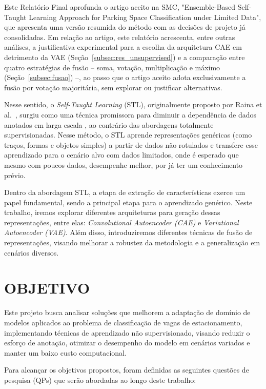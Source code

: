 \documentclass{article}
\begin{document}
Este Relatório Final aprofunda o artigo aceito na SMC, "Ensemble-Based Self-Taught Learning Approach for Parking Space Classification under Limited Data", que apresenta uma versão resumida do método com as decisões de projeto já consolidadas. Em relação ao artigo, este relatório acrescenta, entre outras análises, a justificativa experimental para a escolha da arquitetura CAE em detrimento da VAE (Seção~\ref{subsec:res_unsupervised}) e a comparação entre quatro estratégias de fusão -- soma, votação, multiplicação e máximo (Seção~\ref{subsec:fusao}) --, ao passo que o artigo aceito adota exclusivamente a fusão por votação majoritária, sem explorar ou justificar alternativas.

Nesse sentido, o \textit{Self-Taught Learning} (STL), originalmente proposto por Raina et al.~\cite{Raina2007SelfTaught}, surgiu como uma técnica promissora para diminuir a dependência de dados anotados em larga escala \cite{Delazeri2025Representation,zhang2023STL,vaiyapuri2024STL, germani2023STL}, ao contrário das abordagens totalmente supervisionadas. Nesse método, o STL aprende representações genéricas (como traços, formas e objetos simples) a partir de dados não rotulados e transfere esse aprendizado para o cenário alvo com dados limitados, onde é esperado que mesmo com poucos dados, desempenhe melhor, por já ter um conhecimento prévio. 

Dentro da abordagem STL, a etapa de extração de características exerce um papel fundamental, sendo a principal etapa para o aprendizado genérico. Neste trabalho, iremos explorar diferentes arquiteturas para geração dessas representações, entre elas: \textit{Convolutional Autoencoder (CAE)} e \textit{Variational Autoencoder (VAE)}. Além disso, introduziremos diferentes técnicas de fusão de representações, visando melhorar a robustez da metodologia e a generalização em cenários diversos. 

\section{OBJETIVO}
Este projeto busca analisar soluções que melhorem a adaptação de domínio de
modelos aplicados ao problema de classificação de vagas de estacionamento, implementando técnicas de aprendizado não supervisionado, visando reduzir o esforço
de anotação, otimizar o desempenho do modelo em cenários variados e manter um
baixo custo computacional.

Para alcançar os objetivos propostos, foram definidas as seguintes questões de pesquisa (QPs) que serão abordadas ao longo deste trabalho:
\end{document}
